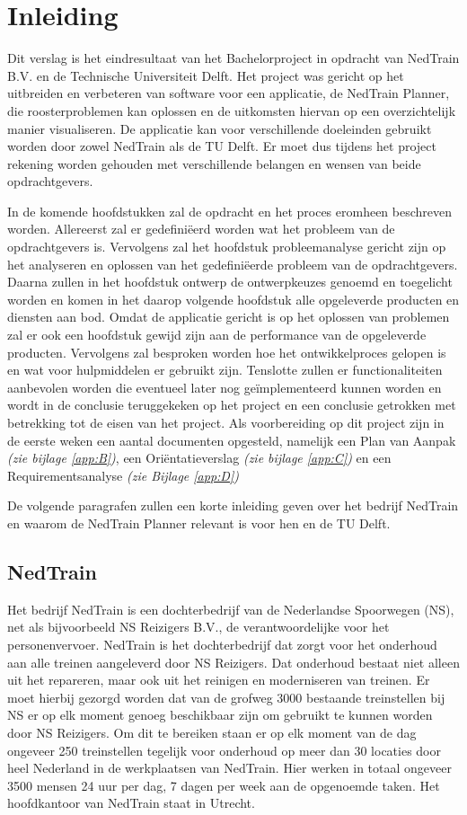 \section{Inleiding}
Dit verslag is het eindresultaat van het Bachelorproject in opdracht van NedTrain B.V. en de Technische Universiteit Delft. Het project was gericht op het uitbreiden en verbeteren van software voor een applicatie, de NedTrain Planner, die roosterproblemen kan oplossen en de uitkomsten hiervan op een overzichtelijk manier visualiseren. De applicatie kan voor verschillende doeleinden gebruikt worden door zowel NedTrain als de TU Delft. Er moet dus tijdens het project rekening worden gehouden met verschillende belangen en wensen van beide opdrachtgevers.

In de komende hoofdstukken zal de opdracht en het proces eromheen beschreven worden. Allereerst zal er gedefini\"eerd worden wat het probleem van de opdrachtgevers is. Vervolgens zal het hoofdstuk probleemanalyse gericht zijn op het analyseren en oplossen van het gedefini\"eerde probleem van de opdrachtgevers. Daarna zullen in het hoofdstuk ontwerp de ontwerpkeuzes genoemd en toegelicht worden en komen in het daarop volgende hoofdstuk alle opgeleverde producten en diensten aan bod. Omdat de applicatie gericht is op het oplossen van problemen zal er ook een hoofdstuk gewijd zijn aan de performance van de opgeleverde producten. Vervolgens zal besproken worden hoe het ontwikkelproces gelopen is en wat voor hulpmiddelen er gebruikt zijn. Tenslotte zullen er functionaliteiten aanbevolen worden die eventueel later nog ge\"implementeerd kunnen worden en wordt in de conclusie teruggekeken op het project en een conclusie getrokken met betrekking tot de eisen van het project. Als voorbereiding op dit project zijn in de eerste weken een aantal documenten opgesteld, namelijk een Plan van Aanpak \emph{(zie bijlage \ref{app:B})}, een Ori\"entatieverslag \emph{(zie bijlage \ref{app:C})} en een Requirementsanalyse \emph{(zie Bijlage \ref{app:D})}

De volgende paragrafen zullen een korte inleiding geven over het bedrijf NedTrain en waarom de NedTrain Planner relevant is voor hen en de TU Delft.

\subsection{NedTrain}
Het bedrijf NedTrain is een dochterbedrijf van de Nederlandse Spoorwegen (NS), net als bijvoorbeeld NS Reizigers B.V., de verantwoordelijke voor het personenvervoer. NedTrain is het dochterbedrijf dat zorgt voor het onderhoud aan alle treinen aangeleverd door NS Reizigers. Dat onderhoud bestaat niet alleen uit het repareren, maar ook uit het reinigen en moderniseren van treinen. Er moet hierbij gezorgd worden dat van de grofweg 3000 bestaande treinstellen bij NS er op elk moment genoeg beschikbaar zijn om gebruikt te kunnen worden door NS Reizigers. Om dit te bereiken staan er op elk moment van de dag ongeveer 250 treinstellen tegelijk voor onderhoud op meer dan 30 locaties door heel Nederland in de werkplaatsen van NedTrain. Hier werken in totaal ongeveer 3500 mensen 24 uur per dag, 7 dagen per week aan de opgenoemde taken. Het hoofdkantoor van NedTrain staat in Utrecht.

